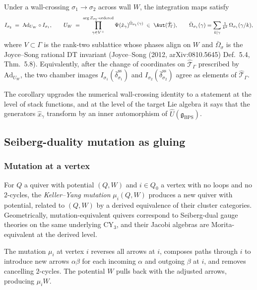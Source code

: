 \begin{corollary}
 \label{cor:I-chamber-equivariance}
 Under a wall-crossing $\sigma_1 \to \sigma_2$ across wall $W$,
 the integration maps satisfy
 \[
 I_{\sigma_2} \;=\; \mathrm{Ad}_{U_W} \circ I_{\sigma_1},
 \qquad
 U_W \;=\; \prod_{\gamma \in V^+}^{\arg Z_{\sigma_1}\text{-ordered}} \Psi(\hat{x}_\gamma)^{\bar{\Omega}_{\sigma_1}(\gamma)}
 \;\in\; \Aut(\hat{\mathcal{T}}_\Gamma),
 \qquad
 \bar{\Omega}_{\sigma_1}(\gamma) = \sum_{k \mid \gamma} \tfrac{1}{k^2}\,\Omega_{\sigma_1}(\gamma/k),
 \]
 where $V \subset \Gamma$ is the rank-two sublattice whose phases align
 on $W$ and $\bar{\Omega}_{\sigma}$ is the Joyce--Song rational DT
 invariant (Joyce--Song (2012, arXiv:0810.5645) Def.~5.4, Thm.~5.8).
 Equivalently, after the change of coordinates on $\hat{\mathcal{T}}_\Gamma$
 prescribed by $\mathrm{Ad}_{U_W}$, the two chamber images
 $I_{\sigma_1}(\bar{\delta}^{\mathrm{ss}}_{\sigma_1})$ and
 $I_{\sigma_2}(\bar{\delta}^{\mathrm{ss}}_{\sigma_2})$ agree as
 elements of $\hat{\mathcal{T}}_\Gamma$.
\end{corollary}

The corollary upgrades the numerical wall-crossing identity to a statement at
the level of stack functions, and at the level of the target Lie algebra it
says that the generators $\hat{x}_\gamma$ transform by an inner automorphism of
$\hat{U}(\mathfrak{g}_{\mathrm{BPS}})$.

\subsection{Seiberg-duality mutation as gluing}
\label{sec:seiberg-mutation-gluing}

\subsubsection{Mutation at a vertex}

For $Q$ a quiver with potential $(Q, W)$ and $i \in Q_0$ a vertex with no
loops and no $2$-cycles, the \emph{Keller--Yang mutation} $\mu_i(Q, W)$
produces a new quiver with potential, related to $(Q, W)$ by a derived
equivalence of their cluster categories. Geometrically,
mutation-equivalent quivers correspond to Seiberg-dual gauge theories on the
same underlying CY$_3$, and their Jacobi algebras are Morita-equivalent at
the derived level.

\begin{definition}
 \label{def:quiver-mutation}
 The mutation $\mu_i$ at vertex $i$ reverses all arrows at $i$, composes
 paths through $i$ to introduce new arrows $\alpha \beta$ for each
 incoming $\alpha$ and outgoing $\beta$ at $i$, and removes cancelling
 $2$-cycles. The potential $W$ pulls back with the adjusted arrows,
 producing $\mu_i W$.
\end{definition}

